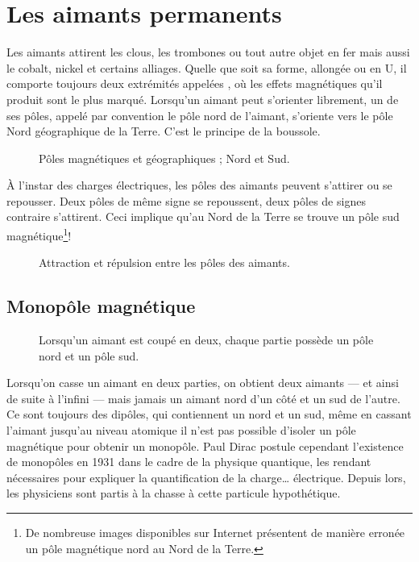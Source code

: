 \section{Les aimants permanents}
Les aimants attirent les clous, les trombones ou tout autre objet en fer mais aussi le cobalt, nickel et certains alliages. Quelle que soit sa forme, allongée ou en U, il comporte toujours deux extrémités appelées , où les effets magnétiques qu'il produit sont le plus marqué. Lorsqu'un aimant peut s'orienter librement, un de ses pôles, appelé par convention le pôle nord de l'aimant, s'oriente vers le pôle Nord géographique de la Terre. C'est le principe de la boussole.
\begin{figure}[h!]
    \centering
    {}
    \caption{Pôles magnétiques et géographiques ; Nord et Sud.}
    \label{champ_magnetique_terre}
\end{figure}

\newpage
À l'instar des charges électriques, les pôles des aimants peuvent s'attirer ou se repousser. Deux pôles de même signe se repoussent, deux pôles de signes contraire s'attirent. Ceci implique qu'au Nord de la Terre se trouve un pôle sud magnétique\footnote{De nombreuse images disponibles sur Internet présentent de manière erronée un pôle magnétique nord au Nord de la Terre.}!


\begin{figure}[h!]
    \centering
    \resizebox{.7\linewidth}{!}
    {}
    \caption{Attraction et répulsion entre les pôles des aimants.}
    \label{ar_aimants_droits}
\end{figure}

\newpage

\subsection{Monopôle magnétique}
\begin{wrapfigure}[10]{r}{0.3\textwidth}
    \vspace{-\baselineskip}
    
    \caption{Lorsqu'un aimant est coupé en deux, chaque partie possède un pôle nord et un pôle sud.}
    \label{monopole}
\end{wrapfigure}

Lorsqu'on casse un aimant en deux parties, on obtient deux aimants --- et ainsi de suite à l'infini --- mais jamais un aimant nord d'un côté et un sud de l'autre. Ce sont toujours des dipôles, qui contiennent un nord et un sud, même en cassant l'aimant jusqu'au niveau atomique il n'est pas possible d'isoler un pôle magnétique pour obtenir un monopôle.
Paul Dirac postule cependant l'existence de monopôles en 1931 dans le cadre de la physique quantique, les rendant nécessaires pour expliquer la quantification de la charge… électrique. Depuis lors, les physiciens sont partis à la chasse à cette particule hypothétique.

